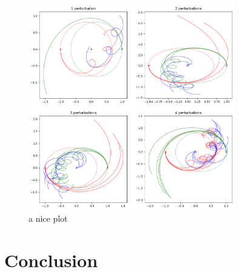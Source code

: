 \documentclass{article}
\begin{document}
\begin{figure}[h!]
    \centering
    \includegraphics[width=0.8\textwidth]{Images/perterbations1to4.png}
    \caption{a nice plot}
    \label{fig:mesh3}
\end{figure}



\section{Conclusion}
\end{document}
